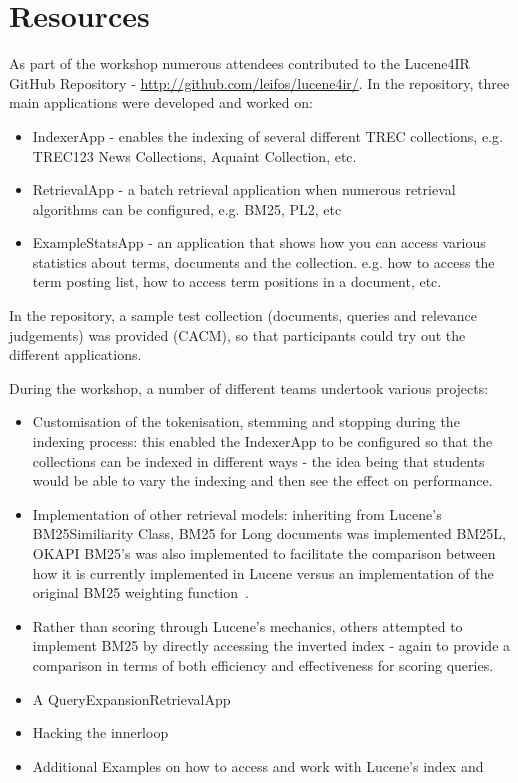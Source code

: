 \section{Resources}
As part of the workshop numerous attendees contributed to the Lucene4IR GitHub Repository - \url{http://github.com/leifos/lucene4ir/}. In the repository, three main applications were developed and worked on:
\begin{itemize}
	\item IndexerApp - enables the indexing of several different TREC collections, e.g. TREC123 News Collections, Aquaint Collection, etc.
	\item RetrievalApp - a batch retrieval application when numerous retrieval algorithms can be configured, e.g. BM25, PL2, etc
	\item ExampleStatsApp - an application that shows how you can access various statistics about terms, documents and the collection. e.g. how to access the term posting list, how to access term positions in a document, etc.
	\end{itemize}
	
In the repository, a sample test collection (documents, queries and relevance judgements) was provided (CACM), so that participants could try out the different applications.

During the workshop, a number of different teams undertook various projects:
\begin{itemize}
	\item Customisation of the tokenisation, stemming and stopping during the indexing process: this enabled the IndexerApp to be configured so that the collections can be indexed in different ways - the idea being that students would be able to vary the indexing and then see the effect on performance.
	\item Implementation of other retrieval models: inheriting from Lucene's BM25Similiarity Class,  BM25 for Long documents was implemented BM25L\cite{}, OKAPI BM25's was also implemented to facilitate the comparison between how it is currently implemented in Lucene versus an implementation of the original BM25 weighting function~\cite{}.
	\item Rather than scoring through Lucene's mechanics, others attempted to implement BM25 by directly accessing the inverted index - again to provide a comparison in terms of both efficiency and effectiveness for scoring queries.
	\item A QueryExpansionRetrievalApp
	\item Hacking the innerloop
	\item Additional Examples on how to access and work with Lucene's index and 
\end{itemize}
